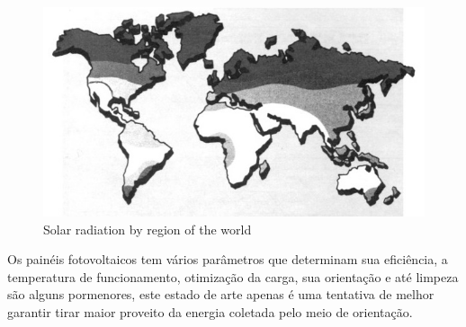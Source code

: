 \begin{figure}[H]
	\centering
	\includegraphics[scale=0.6]{./image/World_Solar_Radiation.jpg}
	\caption{Solar radiation by region of the world \cite{book_2}}
\end{figure}
\newpage
\qquad Os painéis fotovoltaicos tem vários parâmetros que determinam sua eficiência, a temperatura de funcionamento, otimização da carga, sua orientação e até limpeza são alguns pormenores, este estado de arte apenas é uma tentativa de melhor garantir tirar maior proveito da energia coletada pelo meio de orientação.\\
\\
